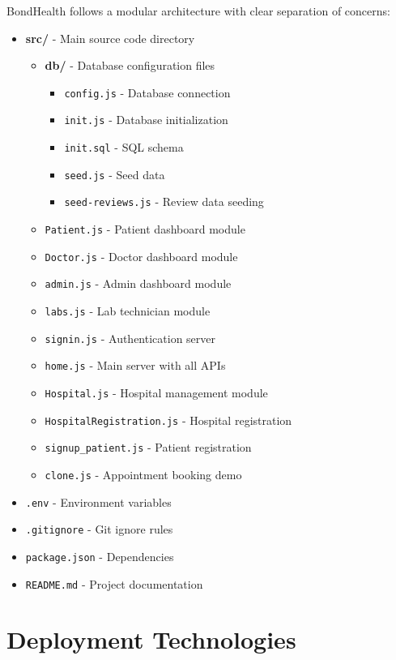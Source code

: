 BondHealth follows a modular architecture with clear separation of concerns:

\begin{itemize}
    \item \textbf{src/} - Main source code directory
    \begin{itemize}
        \item \textbf{db/} - Database configuration files
        \begin{itemize}
            \item \texttt{config.js} - Database connection
            \item \texttt{init.js} - Database initialization
            \item \texttt{init.sql} - SQL schema
            \item \texttt{seed.js} - Seed data
            \item \texttt{seed-reviews.js} - Review data seeding
        \end{itemize}
        \item \texttt{Patient.js} - Patient dashboard module
        \item \texttt{Doctor.js} - Doctor dashboard module
        \item \texttt{admin.js} - Admin dashboard module
        \item \texttt{labs.js} - Lab technician module
        \item \texttt{signin.js} - Authentication server
        \item \texttt{home.js} - Main server with all APIs
        \item \texttt{Hospital.js} - Hospital management module
        \item \texttt{HospitalRegistration.js} - Hospital registration
        \item \texttt{signup\_patient.js} - Patient registration
        \item \texttt{clone.js} - Appointment booking demo
    \end{itemize}
    \item \texttt{.env} - Environment variables
    \item \texttt{.gitignore} - Git ignore rules
    \item \texttt{package.json} - Dependencies
    \item \texttt{README.md} - Project documentation
\end{itemize}

\section{Deployment Technologies}


